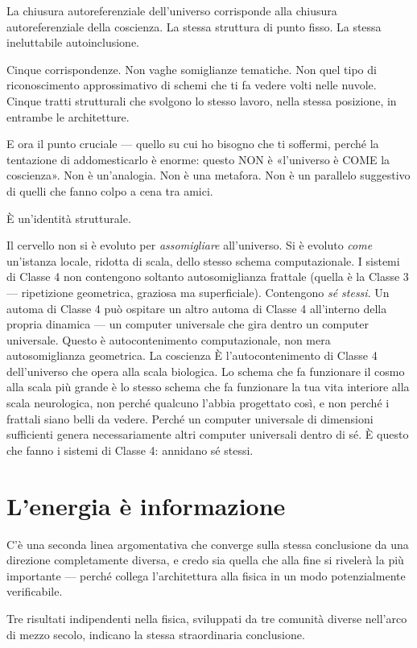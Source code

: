 \documentclass[11pt, twoside, openright]{book}
\begin{document}
La chiusura autoreferenziale dell'universo corrisponde alla chiusura autoreferenziale della coscienza. La stessa struttura di punto fisso. La stessa ineluttabile autoinclusione.

Cinque corrispondenze. Non vaghe somiglianze tematiche. Non quel tipo di riconoscimento approssimativo di schemi che ti fa vedere volti nelle nuvole. Cinque tratti strutturali che svolgono lo stesso lavoro, nella stessa posizione, in entrambe le architetture.

E ora il punto cruciale --- quello su cui ho bisogno che ti soffermi, perché la tentazione di addomesticarlo è enorme: questo NON è «l'universo è COME la coscienza». Non è un'analogia. Non è una metafora. Non è un parallelo suggestivo di quelli che fanno colpo a cena tra amici.

È un'identità strutturale.

Il cervello non si è evoluto per \textit{assomigliare} all'universo. Si è evoluto \textit{come} un'istanza locale, ridotta di scala, dello stesso schema computazionale. I sistemi di Classe 4 non contengono soltanto autosomiglianza frattale (quella è la Classe 3 --- ripetizione geometrica, graziosa ma superficiale). Contengono \textit{sé stessi}. Un automa di Classe 4 può ospitare un altro automa di Classe 4 all'interno della propria dinamica --- un computer universale che gira dentro un computer universale. Questo è autocontenimento computazionale, non mera autosomiglianza geometrica. La coscienza È l'autocontenimento di Classe 4 dell'universo che opera alla scala biologica. Lo schema che fa funzionare il cosmo alla scala più grande è lo stesso schema che fa funzionare la tua vita interiore alla scala neurologica, non perché qualcuno l'abbia progettato così, e non perché i frattali siano belli da vedere. Perché un computer universale di dimensioni sufficienti genera necessariamente altri computer universali dentro di sé. È questo che fanno i sistemi di Classe 4: annidano sé stessi.

\section*{L'energia è informazione}

C'è una seconda linea argomentativa che converge sulla stessa conclusione da una direzione completamente diversa, e credo sia quella che alla fine si rivelerà la più importante --- perché collega l'architettura alla fisica in un modo potenzialmente verificabile.

Tre risultati indipendenti nella fisica, sviluppati da tre comunità diverse nell'arco di mezzo secolo, indicano la stessa straordinaria conclusione.
\end{document}
